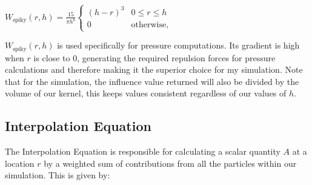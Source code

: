\documentclass[write-up.tex]{subfiles}
\begin{document}
\begin{center}
$
    W_{\text{spiky}}(r, h) = \displaystyle \frac{15}{\pi h^6}
    \begin{cases}
        (h-r)^3 & 0 \leq r \leq h \\
        0 & \text{otherwise},
    \end{cases}
$
\end{center}


$W_{\text{spiky}}(r, h)$ is used specifically for pressure computations. Its gradient is high when $r$ is close to $0$, generating the required repulsion forces for pressure calculations and therefore making it the superior choice for my simulation. Note that for the simulation, the influence value returned will also be divided by the volume of our kernel, this keeps values consistent regardless of our values of $h$.



\subsection{Interpolation Equation}
The Interpolation Equation is responsible for calculating a scalar quantity $A$ at a location $r$ by a weighted sum of contributions from all the particles within our simulation. This is given by:
\end{document}
